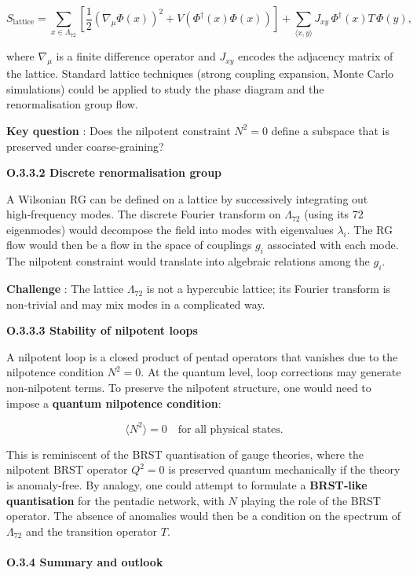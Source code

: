 \documentclass[11pt]{article}
\begin{document}
\[
S_{\text{lattice}} = \sum_{x \in \Lambda_{72}} \left[ \frac{1}{2} (\nabla_\mu \Phi(x))^2 + V(\Phi^\dagger(x)\Phi(x)) \right] + \sum_{\langle x,y \rangle} J_{xy} \, \Phi^\dagger(x) T \,\Phi(y),
\]

where \(\nabla_\mu\) is a finite difference operator and \(J_{xy}\)
encodes the adjacency matrix of the lattice. Standard lattice techniques
(strong coupling expansion, Monte Carlo simulations) could be applied to
study the phase diagram and the renormalisation group flow.

\textbf{Key question} : Does the nilpotent constraint \(N^2 = 0\) define
a subspace that is preserved under coarse‑graining?

\textbf{O.3.3.2 Discrete renormalisation group}

A Wilsonian RG can be defined on a lattice by successively integrating
out high‑frequency modes. The discrete Fourier transform on
\(\Lambda_{72}\) (using its 72 eigenmodes) would decompose the field
into modes with eigenvalues \(\lambda_i\). The RG flow would then be a
flow in the space of couplings \(g_i\) associated with each mode. The
nilpotent constraint would translate into algebraic relations among the
\(g_i\).

\textbf{Challenge} : The lattice \(\Lambda_{72}\) is not a hypercubic
lattice; its Fourier transform is non‑trivial and may mix modes in a
complicated way.

\textbf{O.3.3.3 Stability of nilpotent loops}

A nilpotent loop is a closed product of pentad operators that vanishes
due to the nilpotence condition \(N^2 = 0\). At the quantum level, loop
corrections may generate non‑nilpotent terms. To preserve the nilpotent
structure, one would need to impose a \textbf{quantum nilpotence
condition}:

\[
\langle N^2 \rangle = 0 \quad \text{for all physical states}.
\]

This is reminiscent of the BRST quantisation of gauge theories, where
the nilpotent BRST operator \(Q^2 = 0\) is preserved quantum
mechanically if the theory is anomaly‑free. By analogy, one could
attempt to formulate a \textbf{BRST‑like quantisation} for the pentadic
network, with \(N\) playing the role of the BRST operator. The absence
of anomalies would then be a condition on the spectrum of
\(\Lambda_{72}\) and the transition operator \(T\).

\hypertarget{o.3.4-summary-and-outlook}{%
\paragraph{O.3.4 Summary and outlook}\label{o.3.4-summary-and-outlook}}
\end{document}
